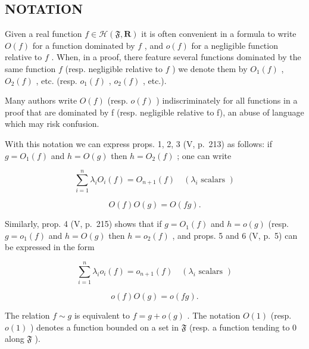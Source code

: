 \subsection{NOTATION}

Given a real function \(f \in \mathcal{H}(\mathfrak{F}, \mathbf{R})\) it is often convenient in a formula to write \(O(f)\) for a function dominated by \(f\) , and \(o(f)\) for a negligible function relative to \(f\) . When, in a proof, there feature several functions dominated by the same function \(f\) (resp. negligible relative to \(f\) ) we denote them by \(O_1(f)\) , \(O_2(f)\) , etc. (resp. \(o_1(f)\) , \(o_2(f)\) , etc.).

Many authors write \(O(f)\) (resp. \(o(f)\) ) indiscriminately for all functions in a proof that are dominated by f (resp. negligible relative to f), an abuse of language which may risk confusion.

With this notation we can express props. 1, 2, 3 (V, p.~213) as follows: if \(g = O_1(f)\) and \(h = O(g)\) then \(h = O_2(f)\) ; one can write

\[
\sum_ {i = 1} ^ {n} \lambda_ {i} O _ {i} (f) = O _ {n + 1} (f) \quad (\lambda_ {i} \text {   scalars })\tag{1}
\]

\[
O (f) O (g) = O (f g).\tag{2}
\]

Similarly, prop. 4 (V, p.~215) shows that if \(g = O_1(f)\) and \(h = o(g)\) (resp. \(g = o_1(f)\) and \(h = O(g)\) then \(h = o_2(f)\) , and props. 5 and 6 (V, p.~5) can be expressed in the form

\[
\sum_ {i = 1} ^ {n} \lambda_ {i} o _ {i} (f) = o _ {n + 1} (f) \quad (\lambda_ {i} \text {   scalars })\tag{3}
\]

\[
o (f) O (g) = o (f g).\tag{4}
\]

The relation \(f \sim g\) is equivalent to \(f = g + o(g)\) . The notation \(O(1)\) (resp. \(o(1)\) ) denotes a function bounded on a set in \(\mathfrak{F}\) (resp. a function tending to 0 along \(\mathfrak{F}\) ).

